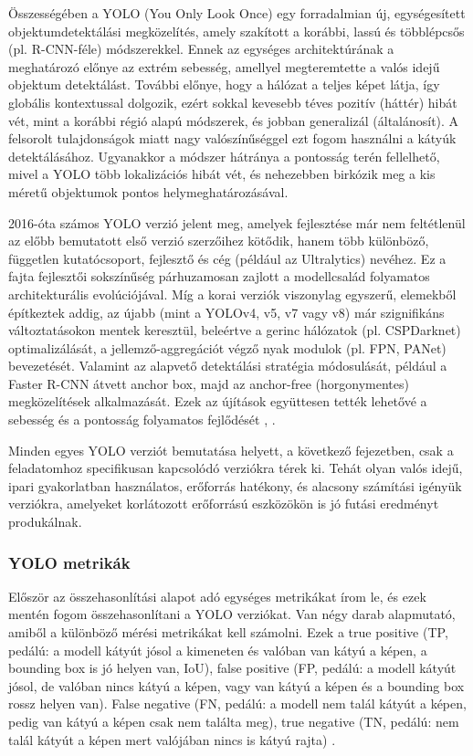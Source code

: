 Összességében a YOLO (You Only Look Once) egy forradalmian új,
egységesített objektumdetektálási megközelítés, amely szakított a
korábbi, lassú és többlépcsős (pl. R-CNN-féle) módszerekkel. Ennek az
egységes architektúrának a meghatározó előnye az extrém sebesség,
amellyel megteremtette a valós idejű objektum detektálást. További
előnye, hogy a hálózat a teljes képet látja, így globális kontextussal
dolgozik, ezért sokkal kevesebb téves pozitív (háttér) hibát vét, mint a
korábbi régió alapú módszerek, és jobban generalizál (általánosít). A
felsorolt tulajdonságok miatt nagy valószínűséggel ezt fogom használni a
kátyúk detektálásához. Ugyanakkor a módszer hátránya a pontosság terén
fellelhető, mivel a YOLO több lokalizációs hibát vét, és nehezebben
birkózik meg a kis méretű objektumok pontos helymeghatározásával. \cite{redmonYouOnlyLook2016}

2016-óta számos YOLO verzió jelent meg, amelyek fejlesztése már nem
feltétlenül az előbb bemutatott első verzió szerzőihez kötődik, hanem
több különböző, független kutatócsoport, fejlesztő és cég (például az
Ultralytics) nevéhez. Ez a fajta fejlesztői sokszínűség párhuzamosan
zajlott a modellcsalád folyamatos architekturális evolúciójával. Míg a
korai verziók viszonylag egyszerű, elemekből építkeztek addig, az újabb
(mint a YOLOv4, v5, v7 vagy v8) már szignifikáns változtatásokon mentek
keresztül, beleértve a gerinc hálózatok (pl. CSPDarknet)
optimalizálását, a jellemző-aggregációt végző nyak modulok (pl. FPN,
PANet) bevezetését. Valamint az alapvető detektálási stratégia
módosulását, például a Faster R-CNN átvett anchor box, majd az
anchor-free (horgonymentes) megközelítések alkalmazását. Ezek az
újítások együttesen tették lehetővé a sebesség és a pontosság folyamatos
fejlődését \cite{tervenComprehensiveReviewYOLO2023}, \cite{hussainYOLOv1YOLOv8Rise2023}.

Minden egyes YOLO verziót bemutatása helyett, a következő fejezetben,
csak a feladatomhoz specifikusan kapcsolódó verziókra térek ki. Tehát
olyan valós idejű, ipari gyakorlatban használatos, erőforrás hatékony,
és alacsony számítási igényük verziókra, amelyeket korlátozott
erőforrású eszközökön is jó futási eredményt produkálnak.

\subsubsection{YOLO metrikák}
\label{yolo-metrikak}

Először az összehasonlítási alapot adó egységes metrikákat írom le, és
ezek mentén fogom összehasonlítani a YOLO verziókat. Van négy darab
alapmutató, amiből a különböző mérési metrikákat kell számolni. Ezek a
true positive (TP, pedálú: a modell kátyút jósol a kimeneten és valóban
van kátyú a képen, a bounding box is jó helyen van, IoU), false positive
(FP, pedálú: a modell kátyút jósol, de valóban nincs kátyú a képen, vagy
van kátyú a képen és a bounding box rossz helyen van). False negative
(FN, pedálú: a modell nem talál kátyút a képen, pedig van kátyú a képen
csak nem találta meg), true negative (TN, pedálú: nem talál kátyút a
képen mert valójában nincs is kátyú rajta) \cite{liuDeepLearningGeneric2019}.

